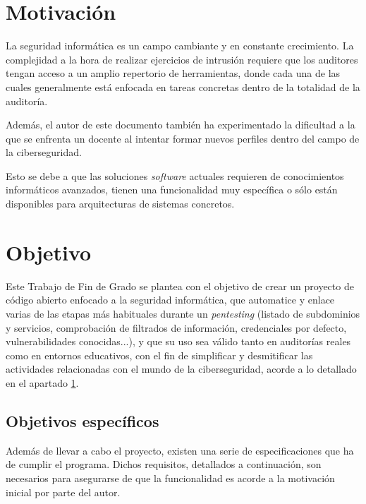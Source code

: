 
\section{Motivación} \label{sec:motivación}

La seguridad informática es un campo cambiante y en constante crecimiento. La complejidad a la hora de realizar ejercicios de intrusión requiere que los auditores tengan acceso a un amplio repertorio de herramientas, donde cada una de las cuales generalmente está enfocada en tareas concretas dentro de la totalidad de la auditoría.\sn

Además, el autor de este documento también ha experimentado la dificultad a la que se enfrenta un docente al intentar formar nuevos perfiles dentro del campo de la ciberseguridad.\sn

Esto se debe a que las soluciones \textit{software} actuales requieren de conocimientos informáticos avanzados, tienen una funcionalidad muy específica o sólo están disponibles para arquitecturas de sistemas concretos.




\section{Objetivo} \label{sec:objetivos}

Este Trabajo de Fin de Grado se plantea con el objetivo de crear un proyecto de código abierto enfocado a la seguridad informática, que automatice y enlace varias de las etapas más habituales durante un \textit{pentesting} (listado de subdominios y servicios, comprobación de filtrados de información, credenciales por defecto, vulnerabilidades conocidas...), y que su uso sea válido tanto en auditorías reales como en entornos educativos, con el fin de simplificar y desmitificar las actividades relacionadas con el mundo de la ciberseguridad, acorde a lo detallado en el apartado \ref{sec:motivación}.\n

\subsection{Objetivos específicos} \label{sub:objetivosespecificos}

Además de llevar a cabo el proyecto, existen una serie de especificaciones que ha de cumplir el programa. Dichos requisitos, detallados a continuación, son necesarios para asegurarse de que la funcionalidad es acorde a la motivación inicial por parte del autor.\sn

